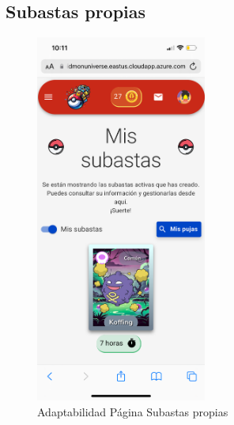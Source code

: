 \subsection*{Subastas propias}
\begin{figure}[H]
    \centering
    \includegraphics[width=0.5\textwidth]{figures/adaptabilidad/mis_subastas.png}
    \caption{Adaptabilidad Página Subastas propias}
    \label{fig:Adap-Mis-Subastas}
\end{figure}

